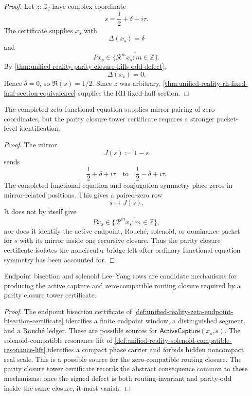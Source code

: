 \begin{proof}
Let $z:\mathcal Z_{\zeta}$ have complex coordinate
$$
s=\frac12+\delta+i\tau.
$$
The certificate supplies $x_s$ with
$$
\Delta(x_s)=\delta
$$
and
$$
P x_s\in\overline{\{\mathcal R^m x_s:m\in\mathbb Z\}}.
$$
By
\autoref{thm:unified-reality-parity-closure-kills-odd-defect},
$$
\Delta(x_s)=0.
$$
Hence $\delta=0$, so $\Re(s)=1/2$.  Since $z$ was arbitrary,
\autoref{thm:unified-reality-rh-fixed-half-section-equivalence} supplies
the RH fixed-half section.
\end{proof}

\begin{corollary}
\label{cor:unified-reality-functional-equation-pairing-not-packet-closure}
The completed zeta functional equation supplies mirror pairing of zero
coordinates, but the parity closure tower certificate requires a
stronger packet-level identification.
\end{corollary}

\begin{proof}
The mirror
$$
J(s):=1-\overline{s}
$$
sends
$$
\frac12+\delta+i\tau
\quad\text{to}\quad
\frac12-\delta+i\tau.
$$
The completed functional equation and conjugation symmetry place zeros
in mirror-related positions.  This gives a paired-zero row
$$
s\longmapsto J(s).
$$
It does not by itself give
$$
P x_s\in\overline{\{\mathcal R^m x_s:m\in\mathbb Z\}},
$$
nor does it identify the active endpoint, Rouch\'e, solenoid, or
dominance packet for $s$ with its mirror inside one recursive closure.
Thus the parity closure certificate isolates the noncircular bridge
left after ordinary functional-equation symmetry has been accounted for.
\end{proof}

\begin{corollary}
\label{cor:unified-reality-parity-closure-relation-endpoint-solenoid}
Endpoint bisection and solenoid Lee--Yang rows are candidate mechanisms
for producing the active capture and zero-compatible routing closure
required by a parity closure tower certificate.
\end{corollary}

\begin{proof}
The endpoint bisection certificate of
\autoref{def:unified-reality-zeta-endpoint-bisection-certificate}
identifies a finite endpoint window, a distinguished segment, and a
Rouch\'e ledger.  These are possible sources for
$\mathsf{ActiveCapture}(x_s,s)$.  The solenoid-compatible resonance lift
of
\autoref{def:unified-reality-solenoid-compatible-resonance-lift}
identifies a compact phase carrier and forbids hidden noncompact real
scale.  This is a possible source for the zero-compatible routing
closure.  The parity closure tower certificate records the abstract
consequence common to these mechanisms: once the signed defect is both
routing-invariant and parity-odd inside the same closure, it must vanish.
\end{proof}

